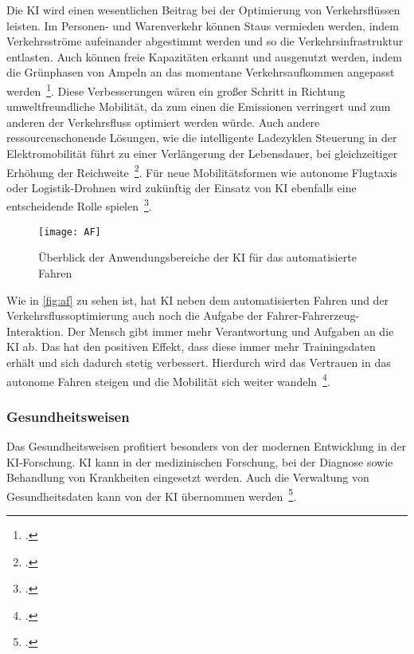 Die \ac{KI} wird einen wesentlichen Beitrag bei der Optimierung von Verkehrsflüssen leisten. Im Personen- und Warenverkehr können Staus vermieden werden, indem Verkehrsströme aufeinander 
abgestimmt werden und so die Verkehrsinfrastruktur entlasten. Auch können freie Kapazitäten erkannt und ausgenutzt werden, indem die Grünphasen von Ampeln an das momentane
Verkehrsaufkommen angepasst werden~\footcite[\vglf][]{Wittpahl.2018}. Diese Verbesserungen wären ein großer Schritt in Richtung umweltfreundliche Mobilität, da zum einen 
die Emissionen verringert und zum anderen der Verkehrsfluss optimiert werden würde. Auch andere ressourcenschonende Lösungen, wie die intelligente Ladezyklen Steuerung in der Elektromobilität
führt zu einer Verlängerung der Lebensdauer, bei gleichzeitiger Erhöhung der Reichweite~\footcite[\vglf][]{Wittpahl.2018}.
Für neue Mobilitätsformen wie autonome Flugtaxis oder Logistik-Drohnen wird zukünftig der Einsatz von KI ebenfalls eine entscheidende Rolle spielen~\footcite[][]{Wittpahl.2018}.

\begin{figure}[H]
    \centering
    \texttt{[image: AF]} 
    \caption[Überblick der Anwendungsbereiche der KI für das automatisierte \mbox{Fahren}]{Überblick der Anwendungsbereiche der KI für das automatisierte \mbox{Fahren}\footnotemark}
    \label{fig:af}
\end{figure}

Wie in \autoref{fig:af} zu sehen ist, hat \ac{KI} neben dem automatisierten Fahren und der Verkehrsflussoptimierung auch noch die Aufgabe der Fahrer-Fahrerzeug-Interaktion. Der Mensch 
gibt immer mehr Verantwortung und Aufgaben an die \ac{KI} ab. Das hat den positiven Effekt, dass diese immer mehr Trainingsdaten erhält und sich dadurch stetig verbessert.
Hierdurch wird das Vertrauen in das autonome Fahren steigen und die Mobilität sich weiter wandeln~\footcite[\vglf][]{Wittpahl.2018}.

\subsubsection{Gesundheitsweisen}

Das Gesundheitsweisen profitiert besonders von der modernen Entwicklung in der \ac{KI}-Forschung. \ac{KI} kann in der medizinischen Forschung, bei der Diagnose sowie Behandlung 
von Krankheiten eingesetzt werden. Auch die Verwaltung von Gesundheitsdaten kann von der \ac{KI} übernommen werden~\footcite[\vglf][]{Robot.2023}.

